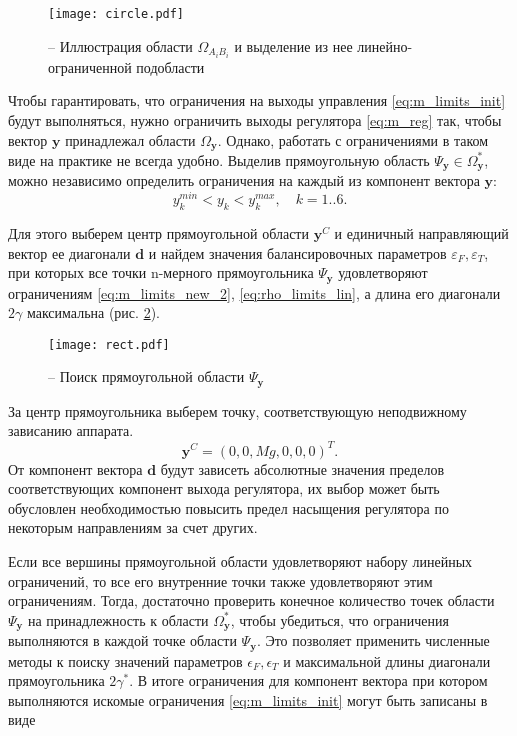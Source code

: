 \begin{figure}[h!]
	\centering
	\texttt{[image: circle.pdf]}
	\caption{ -- Иллюстрация области $\Omega_{A_iB_i}$ и выделение из нее линейно-ограниченной подобласти}
	\label{fig:lim_circle}
\end{figure}

Чтобы гарантировать, что ограничения на выходы управления \eqref{eq:m_limits_init} будут выполняться, нужно ограничить выходы регулятора
\eqref{eq:m_reg}
так, чтобы вектор
$\bm y$
принадлежал области
$\Omega_{\bm{y}}$.
Однако, работать с ограничениями в таком виде на практике не всегда удобно. Выделив прямоугольную область $\Psi_{\bm y} \in \Omega^*_{\bm y}$, можно независимо определить ограничения на каждый из компонент вектора $\bm y$:
\begin{equation} \label{rect_in}
y_k^{min} < y_k < y_k^{max},
\quad k = 1 .. 6.
\end{equation}

Для этого выберем центр прямоугольной области
$\bm y^C$
и единичный направляющий вектор ее диагонали
$\bm d$
и найдем значения балансировочных параметров
$\varepsilon_F, \varepsilon_T$,
при которых все точки n-мерного прямоугольника
$\Psi_{\bm y}$
удовлетворяют ограничениям \eqref{eq:m_limits_new_2}, \eqref{eq:rho_limits_lin}, а длина его диагонали $2\gamma$ максимальна (рис. \ref{fig:reqct_finding}).
\begin{figure}[h!]
	\centering
	\texttt{[image: rect.pdf]}
	\caption{ -- Поиск прямоугольной области $\Psi_{\boldsymbol{y}}$}
	\label{fig:reqct_finding}
\end{figure}
За центр прямоугольника выберем точку, соответствующую неподвижному зависанию аппарата. 
\begin{equation} \label{center}
\bm y^C = (0, 0, Mg, 0, 0, 0)^T.
\end{equation}
От компонент вектора $\bm d$ будут зависеть абсолютные значения пределов соответствующих компонент выхода регулятора, их выбор может быть обусловлен необходимостью повысить предел насыщения регулятора по некоторым направлениям за счет других. 

Если все вершины прямоугольной области удовлетворяют набору линейных ограничений, то все его внутренние точки также удовлетворяют этим ограничениям. Тогда, достаточно проверить конечное количество точек области $\Psi_{\bm y}$ на принадлежность к области $\Omega^*_{\bm y}$, чтобы убедиться, что ограничения выполняются в каждой точке области $\Psi_{\bm y}$. Это позволяет применить численные методы к поиску значений параметров $\epsilon_F, \epsilon_T$ и максимальной длины диагонали прямоугольника $2\gamma^*$. В итоге ограничения для компонент вектора  при котором выполняются искомые ограничения \eqref{eq:m_limits_init} могут быть записаны в виде

